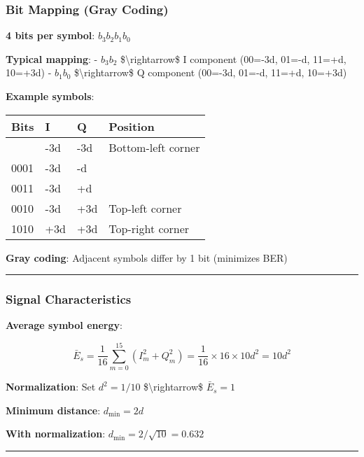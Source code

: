 \subsubsection{Bit Mapping (Gray Coding)}\label{bit-mapping-gray-coding}

\textbf{4 bits per symbol}: \(b_3 b_2 b_1 b_0\)

\textbf{Typical mapping}: - \(b_3 b_2\) \$\textbackslash rightarrow\$ I
component (00=-3d, 01=-d, 11=+d, 10=+3d) - \(b_1 b_0\)
\$\textbackslash rightarrow\$ Q component (00=-3d, 01=-d, 11=+d, 10=+3d)

\textbf{Example symbols}:

{\def\LTcaptype{} %
\begin{longtable}[]{@{}llll@{}}
\toprule\noalign{}
Bits & I & Q & Position \\
\midrule\noalign{}
\endhead
\bottomrule\noalign{}
\endlastfoot
0000 & -3d & -3d & Bottom-left corner \\
0001 & -3d & -d & \\
0011 & -3d & +d & \\
0010 & -3d & +3d & Top-left corner \\
1010 & +3d & +3d & Top-right corner \\
\end{longtable}
}

\textbf{Gray coding}: Adjacent symbols differ by 1 bit (minimizes BER)

\begin{center}\rule{0.5\linewidth}{0.5pt}\end{center}

\subsubsection{Signal Characteristics}\label{signal-characteristics}

\textbf{Average symbol energy}:

\[
\bar{E}_s = \frac{1}{16}\sum_{m=0}^{15} (I_m^2 + Q_m^2) = \frac{1}{16} \times 16 \times 10d^2 = 10d^2
\]

\textbf{Normalization}: Set \(d^2 = 1/10\) \$\textbackslash rightarrow\$
\(\bar{E}_s = 1\)

\textbf{Minimum distance}: \(d_{\min} = 2d\)

\textbf{With normalization}: \(d_{\min} = 2/\sqrt{10} = 0.632\)

\begin{center}\rule{0.5\linewidth}{0.5pt}\end{center}

